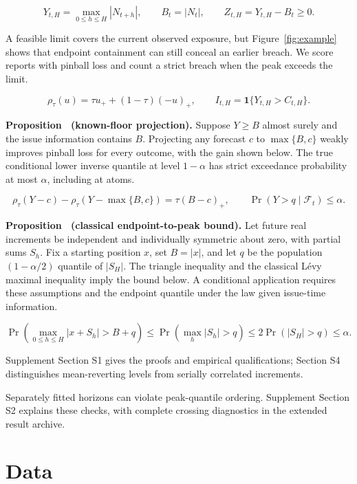 \documentclass[11pt,a4paper]{article}
\newcounter{proposition}
\begin{document}
\[
Y_{t,H}=\max_{0\le h\le H}|N_{t+h}|,\qquad B_t=|N_t|,\qquad Z_{t,H}=Y_{t,H}-B_t\ge0.
\]

A feasible limit covers the current observed exposure, but Figure~\ref{fig:example} shows that endpoint containment can still conceal an earlier breach. We score reports with pinball loss and count a strict breach when the peak exceeds the limit.


\[
\rho_\tau(u)=\tau u_+ +(1-\tau)(-u)_+,\qquad I_{t,H}=\mathbf 1\{Y_{t,H}>C_{t,H}\}.
\]

\noindent\textbf{Proposition~\theproposition{} (known-floor projection).}\label{prop:floor} Suppose \(Y\ge B\) almost surely and the issue information contains \(B\). Projecting any forecast \(c\) to \(\max\{B,c\}\) weakly improves pinball loss for every outcome, with the gain shown below. The true conditional lower inverse quantile at level \(1-\alpha\) has strict exceedance probability at most \(\alpha\), including at atoms.


\[
\rho_\tau(Y-c)-\rho_\tau(Y-\max\{B,c\})=\tau(B-c)_+,\qquad \Pr(Y>q\mid\mathcal F_t)\le\alpha.
\]

\noindent\textbf{Proposition~\theproposition{} (classical endpoint-to-peak bound).}\label{prop:levy} Let future real increments be independent and individually symmetric about zero, with partial sums \(S_h\). Fix a starting position \(x\), set \(B=|x|\), and let \(q\) be the population \((1-\alpha/2)\) quantile of \(|S_H|\). The triangle inequality and the classical L\'evy maximal inequality imply the bound below. A conditional application requires these assumptions and the endpoint quantile under the law given issue-time information.


\[
\Pr\!\left(\max_{0\le h\le H}|x+S_h|>B+q\right)\le\Pr\!\left(\max_h|S_h|>q\right)\le2\Pr(|S_H|>q)\le\alpha.
\]

Supplement Section S1 gives the proofs and empirical qualifications; Section S4 distinguishes mean-reverting levels from serially correlated increments.


Separately fitted horizons can violate peak-quantile ordering. Supplement Section S2 explains these checks, with complete crossing diagnostics in the extended result archive.


\FloatBarrier

\section{Data}\label{sec:data}
\end{document}
